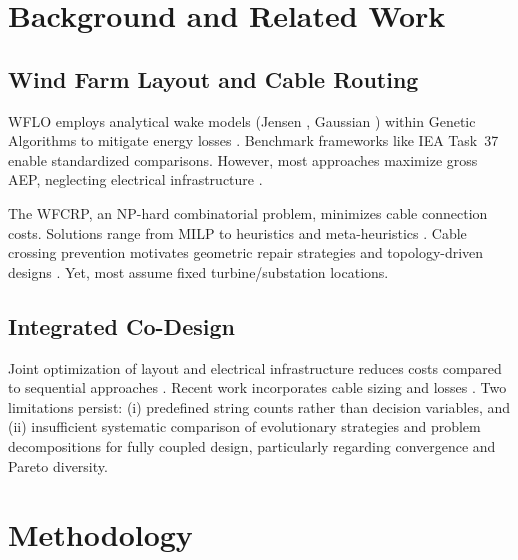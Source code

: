 \documentclass[format=sigconf,anonymous=true,review=true]{acmart}
\begin{document}
\section{Background and Related Work}

\subsection{Wind Farm Layout and Cable Routing}
WFLO employs analytical wake models (Jensen \cite{Jensen1983Wake}, Gaussian \cite{Bastankhah2014Gaussian}) within Genetic Algorithms to mitigate energy losses \cite{Haupt2004, Qureshi2023Hybrid}. Benchmark frameworks like IEA Task~37 \cite{Baker2019Best} enable standardized comparisons. However, most approaches maximize gross AEP, neglecting electrical infrastructure \cite{Silva2025Layout}.

The WFCRP, an NP-hard combinatorial problem, minimizes cable connection costs. Solutions range from MILP \cite{Fischetti2015MILP} to heuristics \cite{Jiangyi2025Topology} and meta-heuristics \cite{Machado2024Hybrid, Yuan2025ACO}. Cable crossing prevention motivates geometric repair strategies \cite{Alencar2026Flexible, Ye2023Path} and topology-driven designs \cite{Shen2023Ring}. Yet, most assume fixed turbine/substation locations.

\subsection{Integrated Co-Design}
Joint optimization of layout and electrical infrastructure reduces costs compared to sequential approaches \cite{Moon2015Optimal, Jin2019PowerLoss, Jin2025Integrated}. Recent work incorporates cable sizing and losses \cite{Wang2019Integrated, Nakhai2023Electrical}. Two limitations persist: (i) predefined string counts rather than decision variables, and (ii) insufficient systematic comparison of evolutionary strategies and problem decompositions for fully coupled design, particularly regarding convergence and Pareto diversity.

\section{Methodology}
\label{sec:methodology}
\end{document}
